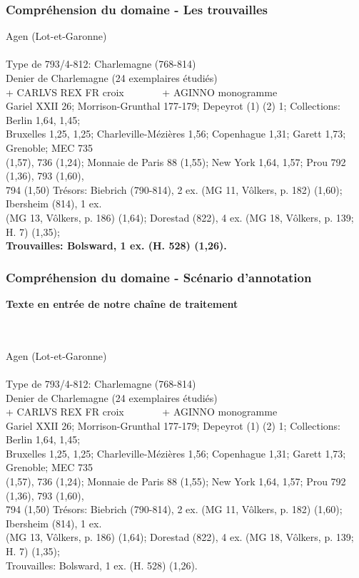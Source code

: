 \documentclass[10pt, compress]{beamer}
\begin{document}
\begin{frame}[fragile]
  \frametitle{Compréhension du domaine - Les trouvailles}
  \begin{scriptsize}
\textcolor{light_gray}{Agen (Lot-et-Garonne)}\\~\\

\textcolor{light_gray}{
Type de 793/4-812: Charlemagne (768-814)\\
Denier de Charlemagne (24 exemplaires étudiés)\\
+ CARLVS REX FR croix~~~~~~~ + AGINNO monogramme
}\\
\textcolor{light_gray}{
Gariel XXII 26; Morrison-Grunthal 177-179; Depeyrot (1) (2) 1;
Collections: Berlin 1,64, 1,45; \\
Bruxelles 1,25, 1,25; Charleville-Mézières 1,56; Copenhague 1,31; Garett 1,73; Grenoble; MEC 735 \\
(1,57), 736 (1,24); Monnaie de Paris 88 (1,55); New York 1,64, 1,57; Prou 792 (1,36), 793 (1,60), \\
794 (1,50) Trésors: Biebrich (790-814), 2 ex. (MG 11, Vôlkers, p. 182) (1,60); Ibersheim (814), 1 ex. \\
(MG 13, Vôlkers, p. 186) (1,64); Dorestad (822), 4 ex. (MG 18, Vôlkers, p. 139; H. 7) (1,35); }\\
\textbf{Trouvailles: Bolsward, 1 ex. (H. 528) (1,26).}
    \end{scriptsize}
\end{frame}
\begin{frame}[fragile]
	\frametitle{Compréhension du domaine - Scénario d'annotation}

	\textbf{Texte en entrée de notre chaîne de traitement}\\~\\~\\
\begin{scriptsize}
Agen (Lot-et-Garonne)\\~\\

Type de 793/4-812: Charlemagne (768-814)\\
Denier de Charlemagne (24 exemplaires étudiés)\\
+ CARLVS REX FR croix~~~~~~~ + AGINNO monogramme\\
Gariel XXII 26; Morrison-Grunthal 177-179; Depeyrot (1) (2) 1; Collections: Berlin 1,64, 1,45;\\
Bruxelles 1,25, 1,25; Charleville-Mézières 1,56; Copenhague 1,31; Garett 1,73; Grenoble; MEC 735 \\
(1,57), 736 (1,24); Monnaie de Paris 88 (1,55); New York 1,64, 1,57; Prou 792 (1,36), 793 (1,60), \\
794 (1,50) Trésors: Biebrich (790-814), 2 ex. (MG 11, Vôlkers, p. 182) (1,60); Ibersheim (814), 1 ex. \\
(MG 13, Vôlkers, p. 186) (1,64); Dorestad (822), 4 ex. (MG 18, Vôlkers, p. 139; H. 7) (1,35);\\
Trouvailles: Bolsward, 1 ex. (H. 528) (1,26).
\end{scriptsize}

\end{frame}
\end{document}
